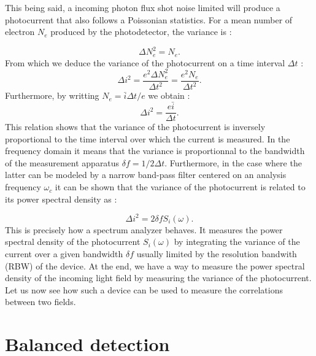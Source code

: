 This being said, a incoming photon flux shot noise limited will produce a photocurrent that also follows a Poissonian statistics. For a mean number 
of electron $N_e$ produced by the photodetector, the variance is :

\begin{equation}
    \label{eq:n_e_variance}
    \Delta N_e^2 = N_e.
\end{equation}
From which we deduce the variance of the photocurrent on a time interval $\Delta t$ :
\begin{equation}
    \label{eq:photocurrent_variance}
    \Delta i^2 = \dfrac{e^2\Delta N_e^2}{\Delta t^2}=\dfrac{e^2N_e}{\Delta t^2}.
\end{equation}
Furthermore, by writting $N_e=\bar{i}\Delta t/e$ we obtain :
\begin{equation}
    \label{eq:photocurrent_variance2}
    \Delta i^2 = \dfrac{e\bar{i}}{\Delta t}.
\end{equation}
This relation shows that the variance of the photocurrent is inversely proportional to the time interval over which the current is measured. In the frequency
domain it means that the variance is proportionnal to the bandwidth of the measurement apparatus $\delta f=1/2\Delta t$. 
Furthermore, in the case where the latter can be modeled by a narrow band-pass filter centered on an analysis frequency $\omega_c$ it can be shown \cite{fabre_houches_97}
that the variance of the photocurrent is related to its power spectral density as :

\begin{equation}
    \label{eq:photocurrent_variance3}
    \Delta i^2 = 2\delta f S_i(\omega).
\end{equation}
This is precisely how a spectrum analyzer behaves. It measures the power spectral density of the photocurrent $S_i(\omega)$ by integrating the variance of the current over a given bandwidth $\delta f$ usually limited by the resolution 
bandwith (RBW) of the device.
At the end, we have a way to measure the power spectral density of the incoming light field by measuring the variance of the photocurrent. 
Let us now see how such a device can be used to measure the correlations between two fields.

\section{Balanced detection}

